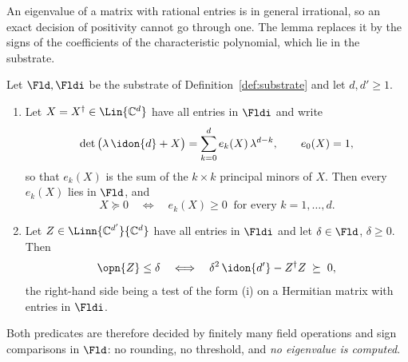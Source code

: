 
An eigenvalue of a matrix with rational entries is in general irrational, so
an exact decision of positivity cannot go through one. The lemma replaces it
by the signs of the coefficients of the characteristic polynomial, which lie
in the substrate.

\begin{lemma}
\label{lem:exactpsd}
Let $\Fld,\Fldi$ be the substrate of Definition~\ref{def:substrate} and let
$d,d'\ge1$.
\begin{enumerate}[label=(\roman*),leftmargin=3.0em]
\item Let $X=X^{\dagger}\in\Lin{\mathbb{C}^{d}}$ have all entries in $\Fldi$ and
  write
  \begin{equation}\label{eq:charpoly}
    \det\big(\lambda\,\idon{d}+X\big)=\sum_{k=0}^{d}e_k(X)\,\lambda^{d-k},
    \qquad e_0(X)=1 ,
  \end{equation}
  so that $e_k(X)$ is the sum of the $k\times k$ principal minors of $X$. Then
  every $e_k(X)$ lies in $\Fld$, and
  \begin{equation}\label{eq:psdtest}
    X\succeq0
    \quad\Longleftrightarrow\quad
    e_k(X)\ge0\ \text{ for every }k=1,\dots,d .
  \end{equation}
\item Let $Z\in\Linn{\mathbb{C}^{d'}}{\mathbb{C}^{d}}$ have all entries in $\Fldi$ and
  let $\delta\in\Fld$, $\delta\ge0$. Then
  \begin{equation}\label{eq:normtest}
    \opn{Z}\le\delta
    \quad\Longleftrightarrow\quad
    \delta^{2}\,\idon{d'}-Z^{\dagger}Z\;\succeq\;0 ,
  \end{equation}
  the right-hand side being a test of the form (i) on a Hermitian matrix with
  entries in $\Fldi$.
\end{enumerate}
Both predicates are therefore decided by finitely many field operations and
sign comparisons in $\Fld$: no rounding, no threshold, and \emph{no
eigenvalue is computed}.
\end{lemma}


